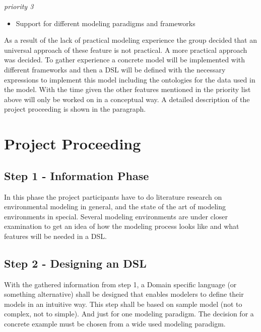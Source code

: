 \emph{priority 3}
\begin{itemize}
	\item Support for different modeling paradigms and frameworks
\end{itemize}

As a result of the lack of practical modeling experience the group decided that an universal approach of these feature is not practical. A more practical approach was decided. To gather experience a concrete model will be implemented with different frameworks and then a DSL will be defined with the necessary expressions to implement this model including the ontologies for the data used in the model. With the time given the other features mentioned in the priority list above will only be worked on in a conceptual way.
A detailed description of the project proceeding is shown in the paragraph.


\section{Project Proceeding}
\subsection{Step 1 - Information Phase}
In this phase the project participants have to do literature research on environmental modeling in general, and the state of the art of modeling environments in special.
Several modeling environments are under closer examination to get an idea of how the modeling process looks like and what features will be needed in a DSL.

\subsection{Step 2 - Designing an DSL}
With the gathered information from step 1, a Domain specific language (or something alternative) shall be designed that enables modelers to define their models in an intuitive way.
This step shall be based on sample model (not to complex, not to simple). And just for one modeling paradigm. The decision for a concrete example must be chosen from a wide used modeling paradigm.

